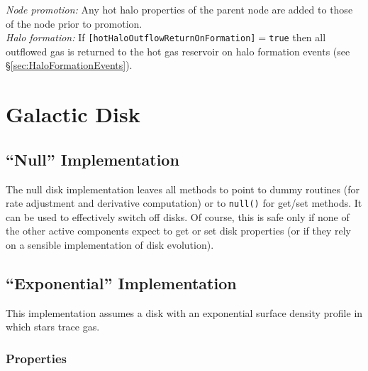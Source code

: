 \noindent\emph{Node promotion:} Any hot halo properties of the parent node are added to those of the node prior to promotion.\\

\noindent\emph{Halo formation:} If {\tt [hotHaloOutflowReturnOnFormation]}$=${\tt true} then all outflowed gas is returned to the hot gas reservoir on halo formation events (see \S\ref{sec:HaloFormationEvents}).\\

\section{Galactic Disk}

\subsection{``Null'' Implementation}

The null disk implementation leaves all methods to point to dummy routines (for rate adjustment and derivative computation) or to {\tt null()} for get/set methods. It can be used to effectively switch off disks. Of course, this is safe only if none of the other active components expect to get or set disk properties (or if they rely on a sensible implementation of disk evolution).

\subsection{``Exponential'' Implementation}\label{sec:DiskExponential}

This implementation assumes a disk with an exponential surface density profile in which stars trace gas.

\subsubsection{Properties}

